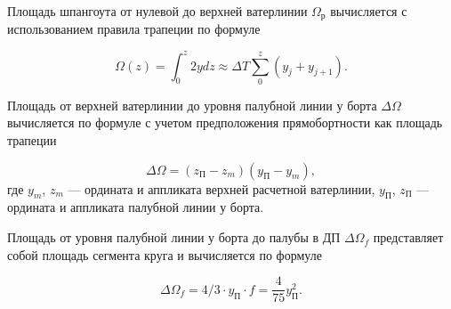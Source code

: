 Площадь шпангоута от нулевой до верхней ватерлинии $\Omega_{\text{р}}$ вычисляется с использованием правила трапеции по формуле

\begin{equation}
    \Omega(z) = \int_0^z 2 y dz \approx \Delta T \sum_0^z (y_j + y_{j+1}).
\end{equation}

Площадь от верхней ватерлинии до уровня палубной линии у борта $\Delta \Omega$ вычисляется по формуле с учетом предположения прямобортности как площадь трапеции

\begin{equation}
    \Delta \Omega = (z_{\text{П}} - z_m) (y_{\text{П}} - y_{m}),
\end{equation}
где $y_m$, $z_m$ --- ордината и аппликата верхней расчетной ватерлинии, $y_{\text{П}}$, $z_{\text{П}}$ --- ордината и аппликата палубной линии у борта.

Площадь от уровня палубной линии у борта до палубы в ДП $\Delta \Omega_f$ представляет собой площадь сегмента круга и вычисляется по формуле

\begin{equation}
    \Delta \Omega_f = 4/3 \cdot y_{\text{П}} \cdot f = \frac{4}{75} y_{\text{П}}^2.
\end{equation}

